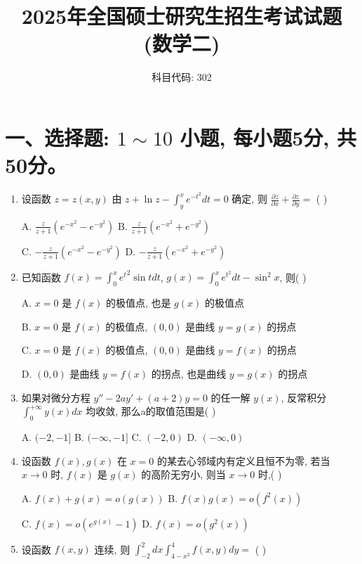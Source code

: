 \documentclass[UTF8]{ctexart}
\begin{document}
\title{2025年全国硕士研究生招生考试试题 \\ (数学二)}
\author{科目代码: 302}
\date{}
\maketitle

\section*{一、选择题: $1\sim10$ 小题, 每小题5分, 共50分。}
\begin{enumerate}

\item 设函数 $z=z(x,y)$ 由 $z+\ln z-\int_{y}^{x}e^{-t^{2}}dt=0$ 确定, 则 $\frac{\partial z}{\partial x}+\frac{\partial z}{\partial y}=$ ( \quad )

    A. $\frac{z}{z+1}(e^{-x^{2}}-e^{-y^{2}})$ \qquad B. $\frac{z}{z+1}(e^{-x^{2}}+e^{-y^{2}})$

    C. $-\frac{z}{z+1}(e^{-x^{2}}-e^{-y^{2}})$ \qquad D. $-\frac{z}{z+1}(e^{-x^{2}}+e^{-y^{2}})$

\item 已知函数 $f(x)=\int_{0}^{x}{e^{t}}^{2}\sin t dt$, $g(x) = \int_{0}^{x}e^{t^{2}}dt-\sin^{2}x$, 则( \quad )

    A. $x=0$ 是 $f(x)$ 的极值点, 也是 $g(x)$ 的极值点

    B. $x=0$ 是 $f(x)$ 的极值点, $(0,0)$ 是曲线 $y=g(x)$ 的拐点

    C. $x=0$ 是 $f(x)$ 的极值点, $(0,0)$ 是曲线 $y=f(x)$ 的拐点

    D. $(0,0)$ 是曲线 $y=f(x)$ 的拐点, 也是曲线 $y=g(x)$ 的拐点

\item 如果对微分方程 $y''-2ay'+(a+2)y=0$ 的任一解 $y(x)$, 反常积分 $\int_{0}^{+\infty}y(x)dx$ 均收敛, 那么a的取值范围是( \quad )

    A. $(-2,-1]$ \qquad B. $(-\infty,-1]$ \qquad C. $(-2,0)$ \qquad D. $(-\infty,0)$

\item 设函数 $f(x), g(x)$ 在 $x=0$ 的某去心邻域内有定义且恒不为零, 若当 $x\rightarrow0$ 时, $f(x)$ 是 $g(x)$ 的高阶无穷小, 则当 $x\rightarrow0$ 时,( \quad )

    A. $f(x)+g(x)=o(g(x))$ \qquad B. $f(x)g(x)=o(f^{2}(x))$

    C. $f(x)=o(e^{g(x)}-1)$ \qquad D. $f(x)=o(g^{2}(x))$

\item 设函数 $f(x,y)$ 连续, 则 $\int_{-2}^{2}dx\int_{4-x^{2}}^{4}f(x,y)dy=$ ( \quad )


\end{enumerate}
\end{document}
